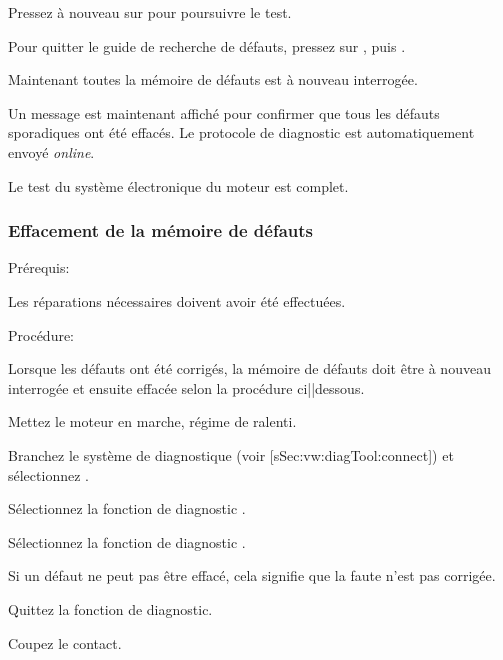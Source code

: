 \startSteps [continue]
\item Pressez à nouveau sur  \inframed{>} pour poursuivre le test.
\item Pour quitter le guide de recherche de défauts, pressez sur , puis .
\stopSteps

Maintenant toutes la mémoire de défauts est à nouveau interrogée.

Un message est maintenant affiché pour confirmer que tous les défauts sporadiques ont été effacés.
Le protocole de diagnostic est automatiquement envoyé {\em online}.

Le test du système électronique du moteur est complet.


\subsubsection{Effacement de la mémoire de défauts}



{\sla Prérequis:}

\startitemize [2]
\item Les réparations nécessaires doivent avoir été effectuées.
\stopitemize

{\sla Procédure:}

\starttextbackground [FC]
\startPictPar
\PMrtfm
\PictPar
Lorsque les défauts ont été corrigés, la mémoire de défauts doit être à nouveau interrogée
et ensuite effacée selon la procédure ci||dessous.
\stopPictPar
\stoptextbackground


\startSteps
\item Mettez le moteur en marche, régime de ralenti.
\item Branchez le système de diagnostique (voir [sSec:vw:diagTool:connect])
et sélectionnez .
\item Sélectionnez la fonction de diagnostic .
\item Sélectionnez la fonction de diagnostic .
\stopSteps


\starttextbackground [FC]
\startPictPar
\PMrtfm
\PictPar
Si un défaut ne peut pas être effacé, cela signifie que la faute n’est pas corrigée.
\stopPictPar
\stoptextbackground

\startSteps [continue]
\item Quittez la fonction de diagnostic.
\item Coupez le contact.
\stopSteps


